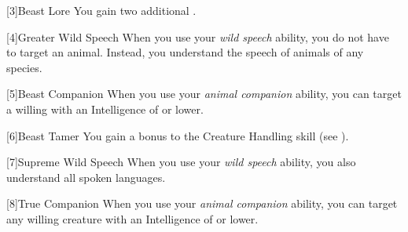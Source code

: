         [3]{Beast Lore} You gain two additional .

        [4]{Greater Wild Speech} When you use your \textit{wild speech} ability, you do not have to target an animal.
        Instead, you understand the speech of animals of any species.

        [5]{Beast Companion} When you use your \textit{animal companion} ability,
        you can target a willing  with an Intelligence of  or lower.

        [6]{Beast Tamer} You gain a  bonus to the Creature Handling skill (see ).

        [7]{Supreme Wild Speech} When you use your \textit{wild speech} ability, you also understand all spoken languages.

        [8]{True Companion} When you use your \textit{animal companion} ability,
        you can target any willing creature with an Intelligence of  or lower.

